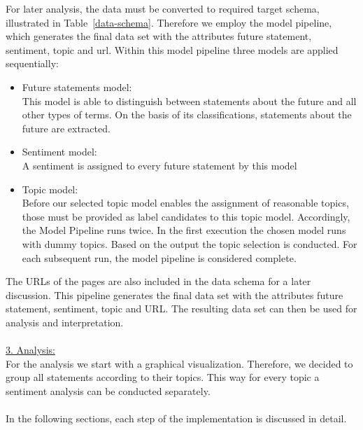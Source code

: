For later analysis, the data must be converted to required target schema, illustrated in Table~\ref{data-schema}. Therefore we employ the model pipeline, which generates the final data set with the attributes future statement, sentiment, topic and url. Within this model pipeline three models are applied sequentially:
\begin{itemize}
    \item Future statements model:\\
    This model is able to distinguish between statements about the future and all other types of terms.
On the basis of its classifications, statements about the future are extracted.
    \item Sentiment model:\\
A sentiment is assigned to every future statement by this model
    \item Topic model: \\
    Before our selected topic model enables the assignment of reasonable topics, those must be provided as label candidates to this topic model.
Accordingly, the Model Pipeline runs twice. In the first execution the chosen model runs with dummy topics. Based on the output the topic selection is conducted.
For each subsequent run, the model pipeline is considered complete.
\end{itemize}

The URLs of the pages are also included in the data schema for a later discussion. This pipeline generates the final data set with the attributes future statement, sentiment, topic and URL. The resulting data set can then be used for analysis and interpretation.
\\
\\
\underline{3. Analysis:}
\\
For the analysis we start with a graphical visualization.
Therefore, we decided to group all statements according to their topics.
This way for every topic a sentiment analysis can be conducted separately.
\\
\\
In the following sections, each step of the implementation is discussed in detail.


\begin{table}[t]
    \centering
\caption{\label{data-schema}
Data schema for visualization and analysis
}
\end{table}


